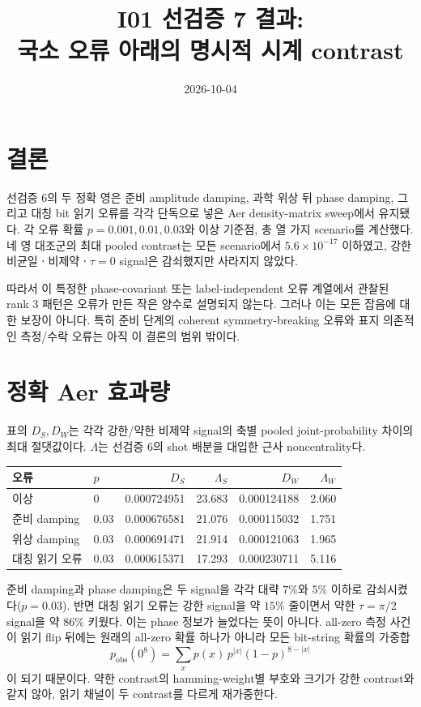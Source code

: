 \documentclass[11pt]{article}
\begin{document}
\title{I01 선검증 7 결과:\\
국소 오류 아래의 명시적 시계 contrast}
\date{2026-10-04}
\maketitle

\section*{결론}
선검증 6의 두 정확 영은 준비 amplitude damping, 과학 위상 뒤 phase damping,
그리고 대칭 bit 읽기 오류를 각각 단독으로 넣은 Aer density-matrix sweep에서
유지됐다. 각 오류 확률 $p=0.001,0.01,0.03$와 이상 기준점, 총 열 가지
scenario를 계산했다. 네 영 대조군의 최대 pooled contrast는 모든 scenario에서
$5.6\times10^{-17}$ 이하였고, 강한 비균일ㆍ비제약ㆍ$\tau=0$ signal은
감쇠했지만 사라지지 않았다.

따라서 이 특정한 phase-covariant 또는 label-independent 오류 계열에서 관찰된
rank 3 패턴은 오류가 만든 작은 양수로 설명되지 않는다. 그러나 이는 모든 잡음에
대한 보장이 아니다. 특히 준비 단계의 coherent symmetry-breaking 오류와
표지 의존적인 측정/수락 오류는 아직 이 결론의 범위 밖이다.

\section*{정확 Aer 효과량}
표의 $D_S,D_W$는 각각 강한/약한 비제약 signal의 축별 pooled joint-probability
차이의 최대 절댓값이다. $\Lambda$는 선검증 6의 shot 배분을 대입한 근사
noncentrality다.

\begin{center}
\begin{tabular}{llrrrr}
\toprule
오류 & $p$ & $D_S$ & $\Lambda_S$ & $D_W$ & $\Lambda_W$\\
\midrule
이상 & 0 & 0.000724951 & 23.683 & 0.000124188 & 2.060\\
준비 damping & 0.03 & 0.000676581 & 21.076 & 0.000115032 & 1.751\\
위상 damping & 0.03 & 0.000691471 & 21.914 & 0.000121063 & 1.965\\
대칭 읽기 오류 & 0.03 & 0.000615371 & 17.293 & 0.000230711 & 5.116\\
\bottomrule
\end{tabular}
\end{center}

준비 damping과 phase damping은 두 signal을 각각 대략 $7\%$와 $5\%$ 이하로
감쇠시켰다($p=0.03$). 반면 대칭 읽기 오류는 강한 signal을 약 $15\%$ 줄이면서
약한 $\tau=\pi/2$ signal을 약 $86\%$ 키웠다. 이는 phase 정보가 늘었다는 뜻이
아니다. all-zero 측정 사건이 읽기 flip 뒤에는 원래의 all-zero 확률 하나가 아니라
모든 bit-string 확률의 가중합
\[
 p_{\mathrm{obs}}(0^8)
 =\sum_x p(x)\,p^{|x|}(1-p)^{8-|x|}
\]
이 되기 때문이다. 약한 contrast의 hamming-weight별 부호와 크기가 강한 contrast와
같지 않아, 읽기 채널이 두 contrast를 다르게 재가중한다.
\end{document}
